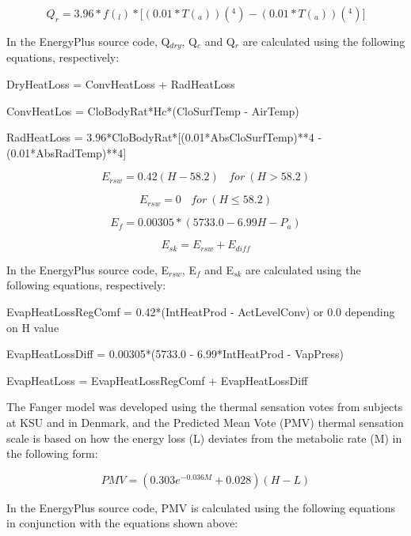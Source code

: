 \begin{equation}
{Q_{r}}=3.96*f\left(_{l}\right)*{[}(0.01*T\left(_{a}\right))\left(^{4}\right)-(0.01*T\left(_{a}\right))\left(^{4}\right){]}
\label{eq:FangerQr}
\end{equation}

In the EnergyPlus source code, Q\(_{dry}\), Q\(_{c}\) and Q\(_{r}\) are calculated using the following equations, respectively:

DryHeatLoss = ConvHeatLoss + RadHeatLoss

ConvHeatLos = CloBodyRat*Hc*(CloSurfTemp - AirTemp)

RadHeatLoss = 3.96*CloBodyRat*{[}(0.01*AbsCloSurfTemp)**4 - (0.01*AbsRadTemp)**4{]}

\begin{equation}
{E_{rsw}} = 0.42(H - 58.2)~~~~for~\left(H > 58.2\right)
\end{equation}

\begin{equation}
{E_{rsw}} = 0~~~~for~\left(H \le 58.2\right)
\end{equation}

\begin{equation}
{E_{f}}=0.00305*(5733.0-6.99H-P_{a})
\end{equation}

\begin{equation}
{E_{sk}} = {E_{rsw}} + {E_{diff}}
\end{equation}

In the EnergyPlus source code, E\(_{rsw}\), E\(_{f}\) and E\(_{sk}\) are calculated using the following equations, respectively:

EvapHeatLossRegComf = 0.42*(IntHeatProd - ActLevelConv) or 0.0 depending on H value

EvapHeatLossDiff = 0.00305*(5733.0 - 6.99*IntHeatProd - VapPress)

EvapHeatLoss = EvapHeatLossRegComf + EvapHeatLossDiff

The Fanger model was developed using the thermal sensation votes from subjects at KSU and in Denmark, and the Predicted Mean Vote (PMV) thermal sensation scale is based on how the energy loss (L) deviates from the metabolic rate (M) in the following form:

\begin{equation}
PMV = (0.303{e^{ - 0.036M}} + 0.028)(H - L)
\end{equation}

In the EnergyPlus source code, PMV is calculated using the following equations in conjunction with the equations shown above:

